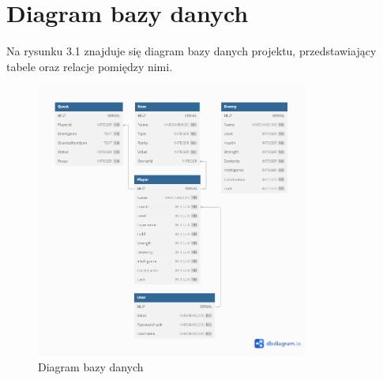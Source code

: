 ﻿%
\chapter{Diagram bazy danych}

Na rysunku 3.1 znajduje się diagram bazy danych projektu, przedstawiający tabele oraz relacje pomiędzy nimi.

\begin{figure}[h]
   \centering
   \includegraphics[width=0.8\textwidth]{figures/dbdiagram.png}
   \caption{Diagram bazy danych}
\end{figure}


